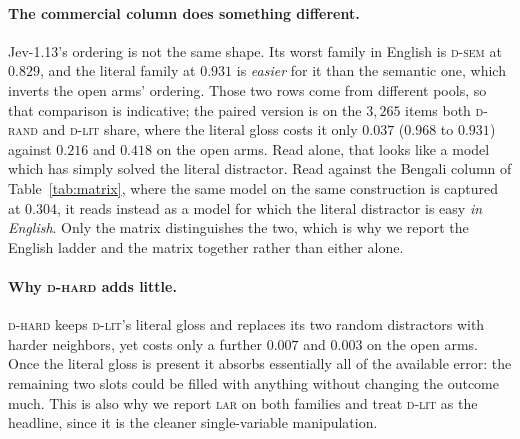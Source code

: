 \documentclass[11pt]{article}
\newcommand{\Drand}{\textsc{d-rand}}
\newcommand{\Dsem}{\textsc{d-sem}}
\newcommand{\Dlit}{\textsc{d-lit}}
\newcommand{\Dhard}{\textsc{d-hard}}
\newcommand{\LAR}{\textsc{lar}}
\begin{document}
\paragraph{The commercial column does something different.} Jev-1.13's ordering is
not the same shape. Its worst family in English is \Dsem{} at $0.829$, and the
literal family at $0.931$ is \emph{easier} for it than the semantic one, which
inverts the open arms' ordering. Those two rows come from different pools, so that
comparison is indicative; the paired version is on the $3{,}265$ items both
\Drand{} and \Dlit{} share, where the literal gloss costs it only $0.037$
($0.968$ to $0.931$) against $0.216$ and $0.418$ on the open arms. Read alone, that looks like a model which has
simply solved the literal distractor. Read against the Bengali column of
Table~\ref{tab:matrix}, where the same model on the same construction is captured
at $0.304$, it reads instead as a model for which the literal distractor is easy
\emph{in English}. Only the matrix distinguishes the two, which is why we report
the English ladder and the matrix together rather than either alone.

\paragraph{Why \Dhard{} adds little.} \Dhard{} keeps \Dlit{}'s literal gloss and
replaces its two random distractors with harder neighbors, yet costs only a further
$0.007$ and $0.003$ on the open arms. Once the literal gloss is present it absorbs essentially all of the
available error: the remaining two slots could be filled with anything without
changing the outcome much. This is also why we report \LAR{} on both families and
treat \Dlit{} as the headline, since it is the cleaner single-variable
manipulation.
\end{document}
